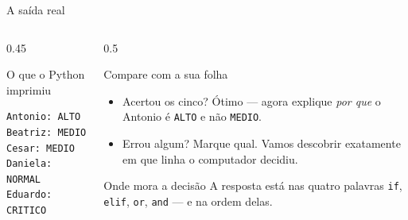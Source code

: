 \documentclass[aspectratio=169]{beamer}
\newcommand{\code}[1]{\texttt{\small #1}}
\begin{document}
\begin{frame}[fragile]{A saída real}
  \begin{columns}[T]
    \begin{column}{0.45\textwidth}
      \begin{block}{O que o Python imprimiu}
\begin{lstlisting}[style=saida]
Antonio: ALTO
Beatriz: MEDIO
Cesar: MEDIO
Daniela: NORMAL
Eduardo: CRITICO
\end{lstlisting}
      \end{block}
    \end{column}
    \begin{column}{0.5\textwidth}
      \begin{exampleblock}{Compare com a sua folha}
        \begin{itemize}
          \item Acertou os cinco? Ótimo --- agora explique \emph{por que}
                o Antonio é \code{ALTO} e não \code{MEDIO}.
          \item Errou algum? Marque qual. Vamos descobrir exatamente
                em que linha o computador decidiu.
        \end{itemize}
      \end{exampleblock}
      \begin{block}{Onde mora a decisão}
        A resposta está nas quatro palavras \code{if}, \code{elif},
        \code{or}, \code{and} --- e na ordem delas.
      \end{block}
    \end{column}
  \end{columns}
\end{frame}
\end{document}
